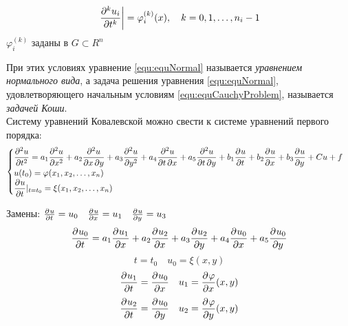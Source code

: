 \begin{equation}
	\left. \frac{\partial^{k}u_i}{\partial t^{k}} \right| = \varphi_i^{(k)} (x), \quad k = 0, 1, \ldots, n_i - 1
	\label{equ:equCauchyProblem}
\end{equation}
$\varphi_i^{(k)}$ заданы в $G \subset R^n$

	При этих условиях уравнение \eqref{equ:equNormal} называется \textit{уравнением нормального вида}, а задача решения уравнения \eqref{equ:equNormal}, удовлетворяющего начальным условиям \eqref{equ:equCauchyProblem}, называется \textit{задачей Коши}.\\


	Систему уравнений Ковалевской можно свести к системе уравнений первого порядка:\\
	
\[
\begin{cases}
	\displaystyle\frac{\partial^{2}u}{\partial t^{2}} = a_1 \frac{\partial^{2}u}{\partial x^{2}} + a_2 \frac{\partial^2u}{\partial x\, \partial y} + a_3 \frac{\partial^{2}u}{\partial y^{2}} + a_4 \frac{\partial^2u}{\partial t\, \partial x} + a_5 \frac{\partial^2u}{\partial t\, \partial y} + b_1 \frac{\partial^{}u}{\partial t^{}} + b_2 \frac{\partial^{}u}{\partial x^{}} + b_3 \frac{\partial^{}u}{\partial y^{}} + Cu + f\\
	\displaystyle u(t_0) = \varphi (x_1, x_2, \dots, x_n)\\
	\displaystyle\frac{\partial^{}u}{\partial t^{}}|_{t = t_0} = \xi (x_1, x_2, \dots, x_n)
\end{cases}
\]

	Замены: $\frac{\partial^{}u}{\partial t^{}} = u_0 \quad \frac{\partial^{}u}{\partial x^{}} = u_1 \quad \frac{\partial^{}u}{\partial y^{}} = u_3$\\
		\[\frac{\partial^{}u_0}{\partial t^{}} = a_1 \frac{\partial^{}u_1}{\partial x^{}} +  a_2 \frac{\partial^{}u_2}{\partial x^{}} +  a_3 \frac{\partial^{}u_2}{\partial y^{}} +  a_4 \frac{\partial^{}u_0}{\partial x^{}} +  a_5 \frac{\partial^{}u_0}{\partial y^{}}\]
		\[t = t_0 \quad u_0 = \xi (x, y)\]
		\[\frac{\partial^{}u_1}{\partial t^{}} = \frac{\partial^{}u_0}{\partial x^{}} \quad u_1 = \frac{\partial^{}\varphi}{\partial x^{}} (x,y)\]
		\[\frac{\partial^{}u_2}{\partial t^{}} = \frac{\partial^{}u_0}{\partial y^{}} \quad u_2 = \frac{\partial^{}\varphi}{\partial y^{}}(x,y)\]


